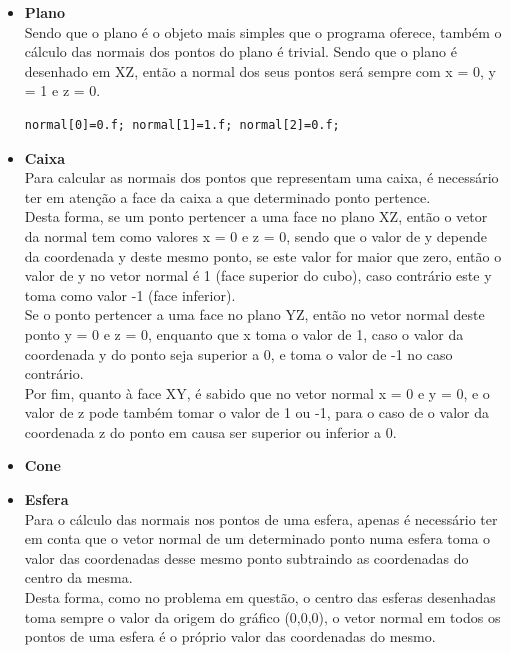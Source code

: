 \documentclass{article}
\begin{document}
\begin{itemize}
\item \textbf{Plano}\\
Sendo que o plano é o objeto mais simples que o programa oferece, também o cálculo das normais dos pontos do plano é trivial. Sendo que o plano é desenhado em XZ, então a normal dos seus pontos será sempre com x = 0, y = 1 e z = 0.
\begin{verbatim}
normal[0]=0.f; normal[1]=1.f; normal[2]=0.f;
\end{verbatim}

\item \textbf{Caixa}\\
Para calcular as normais dos pontos que representam uma caixa, é necessário ter em atenção a face da caixa a que determinado ponto pertence.\\
Desta forma, se um ponto pertencer a uma face no plano XZ, então o vetor da normal tem como valores x = 0 e z = 0, sendo que o valor de y depende da coordenada y deste mesmo ponto, se este valor for maior que zero, então o valor de y no vetor normal é 1 (face superior do cubo), caso contrário este y toma como valor -1 (face inferior).\\
Se o ponto pertencer a uma face no plano YZ, então no vetor normal deste ponto y = 0 e z = 0, enquanto que x toma o valor de 1, caso o valor da coordenada y do ponto seja superior a 0, e toma o valor de -1 no caso contrário.\\
Por fim, quanto à face XY, é sabido que no vetor normal x = 0 e y = 0, e o valor de z pode também tomar o valor de 1 ou -1, para o caso de o valor da coordenada z do ponto em causa ser superior ou inferior a 0.

\item \textbf{Cone}\\

\item \textbf{Esfera}\\
Para o cálculo das normais nos pontos de uma esfera, apenas é necessário ter em conta que o vetor normal de um determinado ponto numa esfera toma o valor das coordenadas desse mesmo ponto subtraindo as coordenadas do centro da mesma.\\
Desta forma, como no problema em questão, o centro das esferas desenhadas toma sempre o valor da origem do gráfico (0,0,0), o vetor normal em todos os pontos de uma esfera é o próprio valor das coordenadas do mesmo.
\end{itemize}
\end{document}
